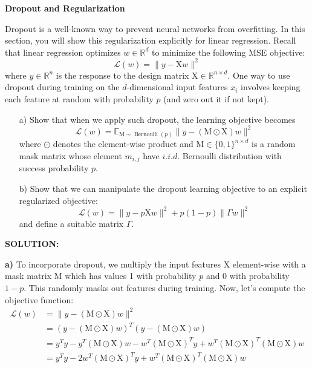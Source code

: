 \documentclass{homework}
\begin{document}
\begin{shaded}
    \question \textbf{Dropout and Regularization}
    
    Dropout is a well-known way to prevent neural networks from overfitting. In this section, you will show this regularization explicitly for linear regression. Recall that linear regression optimizes $w \in \mathbb{R}^{d}$ to minimize the following MSE objective:
    \[
    \mathcal{L}(w)=\|y-\mathrm{X} w\|^{2}
    \]
    where $y \in \mathbb{R}^{n}$ is the response to the design matrix $\mathrm{X} \in \mathbb{R}^{n \times d}$. One way to use dropout during training on the $d$-dimensional input features $x_{i}$ involves keeping each feature at random with probability $p$ (and zero out it if not kept).
    \begin{enumerate}
        \item[a)] Show that when we apply such dropout, the learning objective becomes
        \[
        \mathcal{L}(w)=\mathbb{E}_{\mathrm{M} \sim \operatorname{Bernoulli}(p)}\|y-(\mathrm{M} \odot \mathrm{X}) w\|^{2}
        \]
        where $\odot$ denotes the element-wise product and $\mathrm{M} \in\{0,1\}^{n \times d}$ is a random mask matrix whose element $m_{i, j}$ have $i . i . d$. Bernoulli distribution with success probability $p$.
        \item[b)] Show that we can manipulate the dropout learning objective to an explicit regularized objective:
        \[
        \mathcal{L}(w)=\|y-p \mathrm{X} w\|^{2}+p(1-p)\|\Gamma w\|^{2}
        \]
        and define a suitable matrix $\Gamma$.
    \end{enumerate}
\end{shaded}

\textbf{SOLUTION:}

\textbf{a)} To incorporate dropout, we multiply the input features \(\mathrm{X}\) element-wise with a mask matrix \(\mathrm{M}\) which has values 1 with probability \(p\) and 0 with probability \(1-p\). This randomly masks out features during training. Now, let's compute the objective function:
\[
\begin{aligned}
\mathcal{L}(w) &= \|y - (\mathrm{M} \odot \mathrm{X})w\|^2 \\
&= (y - (\mathrm{M} \odot \mathrm{X})w)^T(y - (\mathrm{M} \odot \mathrm{X})w) \\
&= y^Ty - y^T(\mathrm{M} \odot \mathrm{X})w - w^T(\mathrm{M} \odot \mathrm{X})^Ty + w^T(\mathrm{M} \odot \mathrm{X})^T(\mathrm{M} \odot \mathrm{X})w \\
&= y^Ty - 2w^T(\mathrm{M} \odot \mathrm{X})^Ty + w^T(\mathrm{M} \odot \mathrm{X})^T(\mathrm{M} \odot \mathrm{X})w \\
\end{aligned}
\]
\end{document}
